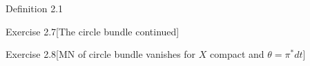 \begin{thing3}{Definition 2.1}
\begin{thing4}{Exercise 2.7}[The circle bundle continued]\label{exer:2.7}\leavevmode

\end{thing4}

\begin{thing4}{Exercise 2.8}[MN of circle bundle vanishes for \(X\) compact and \(\theta=\pi^*dt\)]\label{exer:2.8}\leavevmode

\end{thing4}

\end{thing3}













